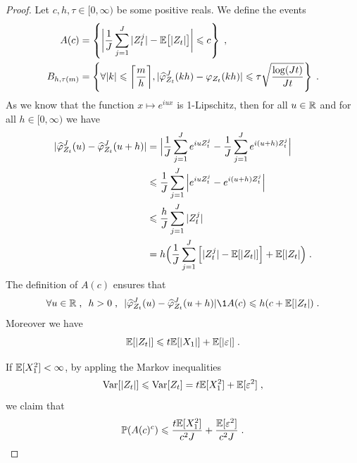 \begin{proof}
Let $c, h, \tau \in [0, \infty)$ be some positive reals. We define the events
    \begin{align*}
        A(c) 
        &= \left\{ \bigg| \frac{1}{J} \sum_{j = 1}^J |Z_t^j| - \mathbb{E}\big[ |Z_t| \big]  \bigg| \leqslant c \right\} 
        \; ,
        \\
        B_{h, \tau(m)} 
        &= \left\{ \forall |k| \leqslant \bigg\lceil \frac{m}{h} \bigg\rceil, |\widehat \varphi^J_{Z_{t}}(k h) - \varphi_{Z_{t}}(k h) | \leqslant \tau \sqrt{\frac{\log (Jt)}{J t}}
        \right\}   \; . \end{align*}
As we know that the function $x \mapsto e^{iux}$ is 1-Lipschitz, then for all $u \in \mathbb{R}$ and for all $h \in [0, \infty)$ we have
    \begin{subequations}
    \begin{align*}
        | \widehat\varphi^J_{Z_t}(u) - \widehat \varphi^J_{Z_t}(u + h)|
        & = \Big| \frac{1}{J}\sum_{j = 1}^J e^{i u Z_t^j} - \frac{1}{J}\sum_{j = 1}^J e^{i (u+h) Z_t^j} \Big| \\
        &\leqslant  \frac{1}{J}\sum_{j = 1}^J \Big| e^{i u Z_t^j} - e^{i (u+h) Z_t^j} \Big| \\
        &\leqslant  \frac{h}{J}\sum_{j = 1}^J |Z_t^j| \\
        &= h \Big( \frac{1}{J} \sum_{j = 1}^J \Big[ |Z_t^j| - \mathbb{E}[|Z_t|] \Big] +  \mathbb{E}[|Z_t| \Big)
        \; .
    \end{align*}
    \end{subequations}
The definition of $A(c)$ ensures that 
    \begin{equation}
        \forall u \in \RR
        \eqsepv
        h > 0
        \eqsepv
        | \hat\varphi^J_{Z_t}(u) - \hat \varphi^J_{Z_t}(u + h)| \1{A(c)}
        \leq
        h ( c + \E[|Z_t|)
        \eqfinp
    \label{eq:duval_5.1}
    \end{equation}
Moreover we have
    \begin{equation}
        \mathbb{E}[|Z_t|] \leqslant t \mathbb{E}[|X_1|] + \mathbb{E}[|\varepsilon|]
        \; .
    \end{equation}
    
If $\mathbb{E}[X_1^2] < \infty$, by appling the Markov inequalities \\
    $$\operatorname{Var}[|Z_t|] \leqslant \operatorname{Var}[Z_t] = t \mathbb{E}[X_1^2] + \mathbb{E}[\varepsilon^2]\; ,$$ 
we claim that
    \begin{equation}
        \mathbb{P}(A(c)^c) \leqslant \frac{t \mathbb{E}[X_1^2]}{c^2 J} + \frac{\mathbb{E}[\varepsilon^2]}{c^2 J}
        \; .
        \label{eq:duval_eq5.2}
    \end{equation}


\end{proof}
